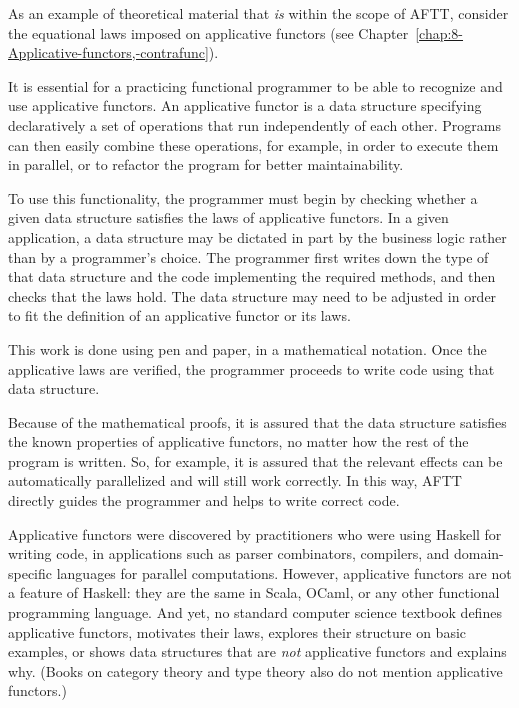 As an example of theoretical material that \emph{is} within the scope
of AFTT, consider the equational laws imposed on applicative functors
(see Chapter~\ref{chap:8-Applicative-functors,-contrafunc}). 

It is essential for a practicing functional programmer to be able
to recognize and use applicative functors. An applicative functor
is a data structure specifying declaratively a set of operations that
run independently of each other. Programs can then easily combine
these operations, for example, in order to execute them in parallel,
or to refactor the program for better maintainability.

To use this functionality, the programmer must begin by checking whether
a given data structure satisfies the laws of applicative functors.
In a given application, a data structure may be dictated in part by
the business logic rather than by a programmer's choice. The programmer
first writes down the type of that data structure and the code implementing
the required methods, and then checks that the laws hold. The data
structure may need to be adjusted in order to fit the definition of
an applicative functor or its laws.

This work is done using pen and paper, in a mathematical notation.
Once the applicative laws are verified, the programmer proceeds to
write code using that data structure.

Because of the mathematical proofs, it is assured that the data structure
satisfies the known properties of applicative functors, no matter
how the rest of the program is written. So, for example, it is assured
that the relevant effects can be automatically parallelized and will
still work correctly. In this way, AFTT directly guides the programmer
and helps to write correct code.

Applicative functors were discovered by practitioners who were using
Haskell for writing code, in applications such as parser combinators,
compilers, and domain-specific languages for parallel computations.
However, applicative functors are not a feature of Haskell: they are
the same in Scala, OCaml, or any other functional programming language.
And yet, no standard computer science textbook defines applicative
functors, motivates their laws, explores their structure on basic
examples, or shows data structures that are \emph{not} applicative
functors and explains why. (Books on category theory and type theory
also do not mention applicative functors.)

